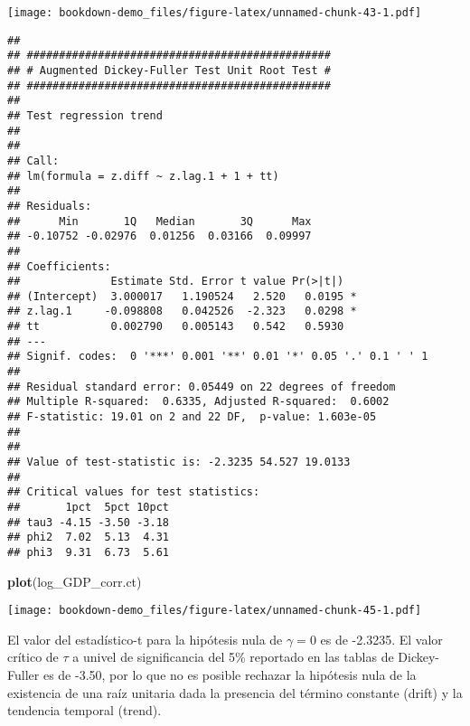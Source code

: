 \documentclass[]{book}
\newenvironment{Shaded}{\begin{snugshade}}{\end{snugshade}}
\newcommand{\KeywordTok}[1]{\textcolor[rgb]{0.13,0.29,0.53}{\textbf{#1}}}
\newcommand{\DataTypeTok}[1]{\textcolor[rgb]{0.13,0.29,0.53}{#1}}
\newcommand{\DecValTok}[1]{\textcolor[rgb]{0.00,0.00,0.81}{#1}}
\newcommand{\StringTok}[1]{\textcolor[rgb]{0.31,0.60,0.02}{#1}}
\newcommand{\OperatorTok}[1]{\textcolor[rgb]{0.81,0.36,0.00}{\textbf{#1}}}
\newcommand{\NormalTok}[1]{#1}
\theoremstyle{definition}
\theoremstyle{definition}
\theoremstyle{definition}
\theoremstyle{remark}
\begin{document}
\texttt{[image: bookdown-demo\_files/figure-latex/unnamed-chunk-43-1.pdf]}

\begin{Shaded}
\end{Shaded}

\begin{verbatim}
## 
## ############################################### 
## # Augmented Dickey-Fuller Test Unit Root Test # 
## ############################################### 
## 
## Test regression trend 
## 
## 
## Call:
## lm(formula = z.diff ~ z.lag.1 + 1 + tt)
## 
## Residuals:
##      Min       1Q   Median       3Q      Max 
## -0.10752 -0.02976  0.01256  0.03166  0.09997 
## 
## Coefficients:
##              Estimate Std. Error t value Pr(>|t|)  
## (Intercept)  3.000017   1.190524   2.520   0.0195 *
## z.lag.1     -0.098808   0.042526  -2.323   0.0298 *
## tt           0.002790   0.005143   0.542   0.5930  
## ---
## Signif. codes:  0 '***' 0.001 '**' 0.01 '*' 0.05 '.' 0.1 ' ' 1
## 
## Residual standard error: 0.05449 on 22 degrees of freedom
## Multiple R-squared:  0.6335, Adjusted R-squared:  0.6002 
## F-statistic: 19.01 on 2 and 22 DF,  p-value: 1.603e-05
## 
## 
## Value of test-statistic is: -2.3235 54.527 19.0133 
## 
## Critical values for test statistics: 
##       1pct  5pct 10pct
## tau3 -4.15 -3.50 -3.18
## phi2  7.02  5.13  4.31
## phi3  9.31  6.73  5.61
\end{verbatim}

\begin{Shaded}
\begin{Highlighting}[]
\KeywordTok{plot}\NormalTok{(log_GDP_corr.ct)}
\end{Highlighting}
\end{Shaded}

\texttt{[image: bookdown-demo\_files/figure-latex/unnamed-chunk-45-1.pdf]}

El valor del estadístico-t para la hipótesis nula de \(\gamma=0\) es de
-2.3235. El valor crítico de \(\tau\) a univel de significancia del 5\%
reportado en las tablas de Dickey-Fuller es de -3.50, por lo que no es
posible rechazar la hipótesis nula de la existencia de una raíz unitaria
dada la presencia del término constante (drift) y la tendencia temporal
(trend).
\end{document}
